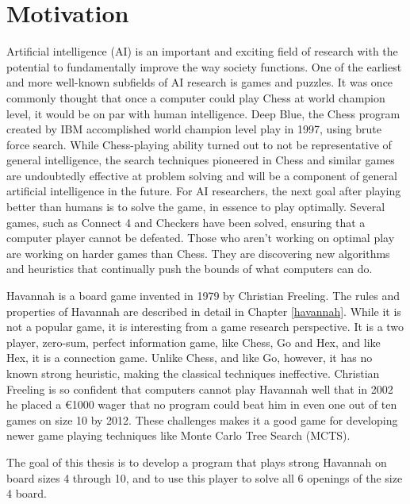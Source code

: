 

\section{Motivation}

Artificial intelligence (AI) is an important and exciting field of research with the potential to fundamentally improve the way society functions. One of the earliest and more well-known subfields of AI research is games and puzzles. It was once commonly thought that once a computer could play Chess at world champion level, it would be on par with human intelligence. Deep Blue, the Chess program created by IBM accomplished world champion level play in 1997, using brute force search. While Chess-playing ability turned out to not be representative of general intelligence, the search techniques pioneered in Chess and similar games are undoubtedly effective at problem solving and will be a component of general artificial intelligence in the future. For AI researchers, the next goal after playing better than humans is to solve the game, in essence to play optimally. Several games, such as Connect 4 and Checkers have been solved, ensuring that a computer player cannot be defeated. Those who aren't working on optimal play are working on harder games than Chess. They are discovering new algorithms and heuristics that  continually push the bounds of what computers can do.

Havannah is a board game invented in 1979 by Christian Freeling. The rules and properties of Havannah are described in detail in Chapter \ref{havannah}. While it is not a popular game, it is interesting from a game research perspective. It is a two player, zero-sum, perfect information game, like Chess, Go and Hex, and like Hex, it is a connection game. Unlike Chess, and like Go, however, it has no known strong heuristic, making the classical techniques ineffective. Christian Freeling is so confident that computers cannot play Havannah well that in 2002 he placed a \euro 1000 wager that no program could beat him in even one out of ten games on size 10 by 2012. These challenges makes it a good game for developing newer game playing techniques like Monte Carlo Tree Search (MCTS).

The goal of this thesis is to develop a program that plays strong Havannah on board sizes 4 through 10, and to use this player to solve all 6 openings of the size 4 board.



